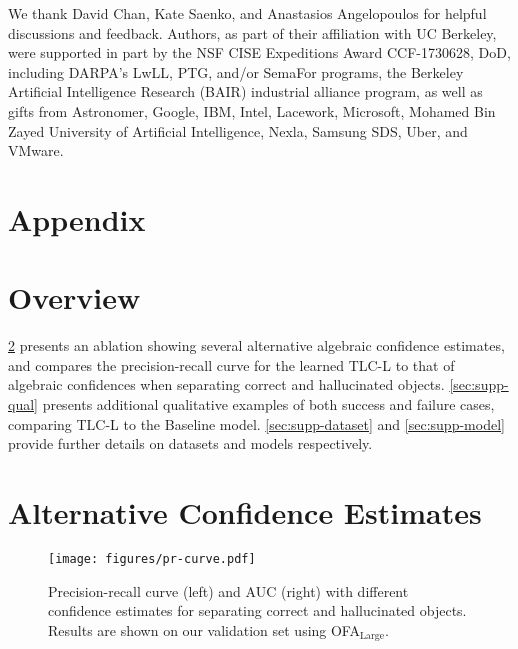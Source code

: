 \documentclass[10pt,twocolumn,letterpaper]{article}
\newcommand{\minisection}[1]{\noindent{\textbf{#1.}}}
\newcommand{\ApproachName}{TLC\xspace}
\newcommand{\OFALarge}{OFA$_{\text{Large}}$\xspace}
\begin{document}
\minisection{Acknowledgements} We thank David Chan, Kate Saenko, and Anastasios Angelopoulos for helpful discussions and feedback.  Authors, as part of their affiliation with UC Berkeley, were supported in part by the NSF CISE Expeditions Award CCF-1730628, DoD, including DARPA’s LwLL, PTG, and/or SemaFor programs, the Berkeley Artificial Intelligence Research (BAIR) industrial alliance program, as well as gifts from Astronomer, Google, IBM, Intel, Lacework, Microsoft, Mohamed Bin Zayed University of Artificial Intelligence, Nexla, Samsung SDS, Uber, and VMware.

{\small


}

\clearpage

\appendix

\section*{Appendix}

\section{Overview}
\label{sec:supp-overview}

\cref{sec:supp-precision-recall} presents an ablation showing several alternative algebraic confidence estimates, and compares the precision-recall curve for the learned \ApproachName-L to that of algebraic confidences when separating correct and hallucinated objects.
\cref{sec:supp-qual} presents additional qualitative examples of both success and failure cases, comparing \ApproachName-L to the Baseline model. \cref{sec:supp-dataset} and \cref{sec:supp-model} provide further details on datasets and models respectively.


\section{Alternative Confidence Estimates}
\label{sec:supp-precision-recall}

\begin{figure*}[h]
  \centering
   \texttt{[image: figures/pr-curve.pdf]}
   \caption{Precision-recall curve (left) and AUC (right) with different confidence estimates for separating correct and hallucinated objects. Results are shown on our validation set using \OFALarge.
   }
   \label{fig:supp-pr}
\end{figure*} 
\end{document}
